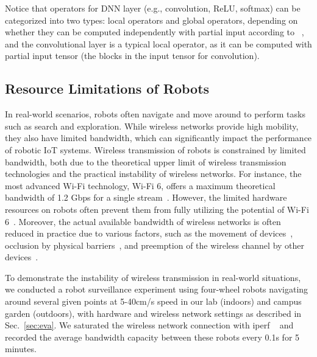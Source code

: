 Notice that operators for DNN layer (e.g., convolution, ReLU, softmax) can be categorized into two types: local operators and global operators, depending on whether they can be computed independently with partial input according to ~\cite{sun2024hybridparallel}, and the convolutional layer is a typical local operator, as it can be computed with partial input tensor (the blocks in the input tensor for convolution).

\subsection{Resource Limitations of Robots}
In real-world scenarios, robots often navigate and move around to perform tasks such as search and exploration. 
While wireless networks provide high mobility, they also have limited bandwidth, which can significantly impact the performance of robotic IoT systems.
Wireless transmission of robots is constrained by limited bandwidth, both due to the theoretical upper limit of wireless transmission technologies and the practical instability of wireless networks. 
For instance, the most advanced Wi-Fi technology, Wi-Fi 6, offers a maximum theoretical bandwidth of 1.2 Gbps for a single stream~\cite{liu2023first}. However, the limited hardware resources on robots often prevent them from fully utilizing the potential of Wi-Fi 6~\cite{yang2022mobile}. 
Moreover, the actual available bandwidth of wireless networks is often reduced in practice due to various factors, such as the movement of devices~\cite{masiukiewicz2019throughput, pei2013connectivity}, occlusion by physical barriers~\cite{ding2015performance, sarkar2013effect}, and preemption of the wireless channel by other devices~\cite{adame2021time, ren2018proportional}.

To demonstrate the instability of wireless transmission in real-world situations, we conducted a robot surveillance experiment using four-wheel robots navigating around several given points at 5-40cm/s speed in our lab (indoors) and campus garden (outdoors), with hardware and wireless network settings as described in Sec.~\ref{sec:eva}. 
We saturated the wireless network connection with iperf ~\cite{noauthor_iperf_nodate} and recorded the average bandwidth capacity between these robots every 0.1s for 5 minutes.

